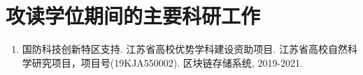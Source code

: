 \chapter{攻读学位期间的主要科研工作}
\begin{enumerate}
	\item 国防科技创新特区支持. 江苏省高校优势学科建设资助项目. 江苏省高校自然科学研究项目，项目号(19KJA550002). 区块链存储系统, 2019-2021.
\end{enumerate}